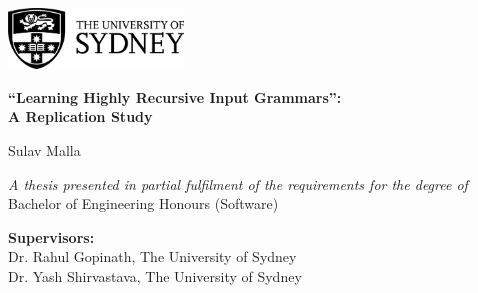 \begin{titlepage}
    \vspace*{1cm}

    \begin{flushleft}
        \begin{center}
            \includegraphics[width=0.35\textwidth]{img/pre_chapters/usyd_logo_full.png}
    
        \vspace{3cm} 
    
        {\LARGE \textbf{\enquote{Learning Highly Recursive Input Grammars}:\\[3pt]A Replication Study}}
    
        \vspace{1.5cm} 
        
        {\Large Sulav Malla} 


        

        \vfill
        
        \textit{A thesis presented in partial fulfilment of the requirements for the degree of\\[3pt]}
        Bachelor of Engineering Honours (Software)
        
        \vspace{2.75cm}
    
        \textbf{Supervisors:}\\
        Dr. Rahul Gopinath, The University of Sydney\\
        Dr. Yash Shirvastava, The University of Sydney
    

\end{center}
\end{flushleft}
\end{titlepage}

